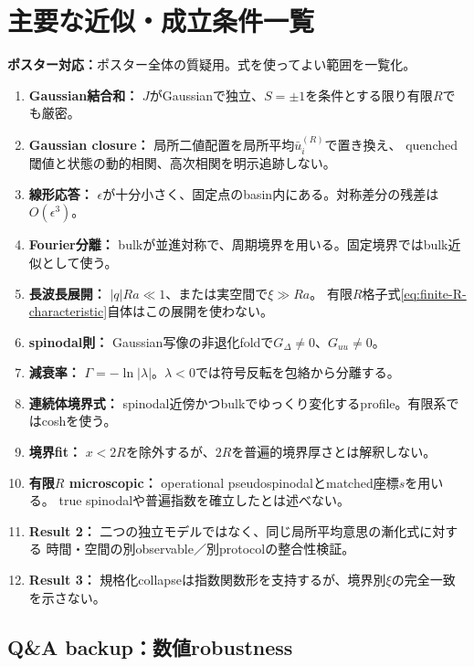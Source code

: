 \documentclass[a4paper,12pt]{ltjsarticle}
\newcommand{\PosterMap}[1]{%
  \begin{tcolorbox}[enhanced,boxrule=0pt,arc=1mm,colback=softgray,
    left=2mm,right=2mm,top=1mm,bottom=1mm,before skip=0pt,after skip=0.7em]
  \normalsize\textbf{ポスター対応：}#1
  \end{tcolorbox}}
\begin{document}
\section{主要な近似・成立条件一覧}\label{sec:assumptions}
\PosterMap{ポスター全体の質疑用。式を使ってよい範囲を一覧化。}

\begin{enumerate}
 \item \textbf{Gaussian結合和：}
 $J$がGaussianで独立、$S=\pm1$を条件とする限り有限$R$でも厳密。
 \item \textbf{Gaussian closure：}
 局所二値配置を局所平均$\bar u_i^{(R)}$で置き換え、
 quenched閾値と状態の動的相関、高次相関を明示追跡しない。
 \item \textbf{線形応答：}
 $\epsilon$が十分小さく、固定点のbasin内にある。対称差分の残差は$O(\epsilon^3)$。
 \item \textbf{Fourier分離：}
 bulkが並進対称で、周期境界を用いる。固定境界ではbulk近似として使う。
 \item \textbf{長波長展開：}
 $|q|Ra\ll1$、または実空間で$\xi\gg Ra$。
 有限$R$格子式\eqref{eq:finite-R-characteristic}自体はこの展開を使わない。
 \item \textbf{spinodal則：}
 Gaussian写像の非退化foldで$G_\Delta\neq0$、$G_{uu}\neq0$。
 \item \textbf{減衰率：}
 $\Gamma=-\ln|\lambda|$。$\lambda<0$では符号反転を包絡から分離する。
 \item \textbf{連続体境界式：}
 spinodal近傍かつbulkでゆっくり変化するprofile。有限系ではcoshを使う。
 \item \textbf{境界fit：}
 $x<2R$を除外するが、$2R$を普遍的境界厚さとは解釈しない。
 \item \textbf{有限$R$ microscopic：}
 operational pseudospinodalとmatched座標$s$を用いる。
 true spinodalや普遍指数を確立したとは述べない。
 \item \textbf{Result 2：}
 二つの独立モデルではなく、同じ局所平均意思の漸化式に対する
 時間・空間の別observable／別protocolの整合性検証。
 \item \textbf{Result 3：}
 規格化collapseは指数関数形を支持するが、境界別$\xi$の完全一致を示さない。
\end{enumerate}

\subsection*{Q\&A backup：数値robustness}
\end{document}
